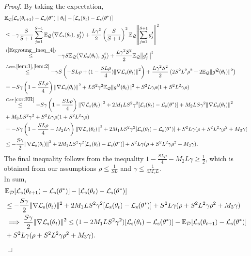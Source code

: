 \documentclass{article}
\theoremstyle{plain}
\theoremstyle{definition}
\theoremstyle{remark}
\newcommand{\ip}[2]{{\left\langle #1, \, #2 \right\rangle}}
\newcommand{\no}[1]{{\left\lVert #1 \right\rVert}}
\newcommand{\EgQ}{\E_\gQ}
\begin{document}
\begin{proof}
    
    By taking the expectation,
    \begin{align*}
        &\EgQ[\gL_{\text{s}}(\theta_{t+1})-\gL_{\text{s}}(\theta^*)\mid\theta_t] - [\gL_{\text{s}}(\theta_t)-\gL_{\text{s}}(\theta^*)] \\
        &\leq -\gamma\frac{S}{S+1}\sum\limits_{j=1}^{S+1}\EgQ\ip{\nabla \gL_{\text{s}}(\theta_t)}{g_j^t}+\frac{L\gamma^2}{2}\left(\frac{S}{S+1}\right)^2\EgQ\no{\sum\limits_{j=1}^{S+1}g_j^t}^2 \\
        &\overset{(\ref{Eq:young_ineq_4})}{\leq} -\gamma S\EgQ\ip{\nabla \gL_{\text{s}}(\theta_t)}{g_j^t}+\frac{L\gamma^2S^2}{2}\EgQ\no{g_j^t}^2 \\
        &\overset{Lem. \ref{lem:1}, \ref{lem:2}}{\leq} -\gamma S \left(-SL\rho + (1-\frac{SL\rho}{4})\no{\nabla \gL_{\text{s}}(\theta_t)}^2\right)+\frac{L\gamma^2S^2}{2}\left(2S^2L^2\rho^2+2\EgQ\lV g^{\gQ}(\theta_t)\rV^2\right) \\
        &=-S\gamma \left(1-\frac{SL\rho}{4}\right)\no{\nabla \gL_{\text{s}}(\theta_t)}^2+LS^2\gamma^2\EgQ\lV g^{\gQ}(\theta_t)\rV^2+S^2L\gamma\rho(1+S^2L^2\gamma\rho)\\
        &\overset{Cor. \ref{cor:ER}}{\leq}-S\gamma \left(1-\frac{SL\rho}{4}\right)\no{\nabla \gL_{\text{s}}(\theta_t)}^2 + 2M_1LS^2\gamma^2[\gL_{\text{s}}(\theta_t)-\gL_{\text{s}}(\theta^*)]+M_2LS\gamma^2\no{\nabla \gL_{\text{s}}(\theta_t)}^2\\&+M_3LS^2\gamma^2+S^2L\gamma\rho(1+S^2L^2\gamma\rho) \\
        &= -S\gamma \left(1-\frac{SL\rho}{4}-M_2L\gamma\right)\no{\nabla \gL_{\text{s}}(\theta_t)}^2 + 2M_1LS^2\gamma^2[\gL_{\text{s}}(\theta_t)-\gL_{\text{s}}(\theta^*)]+S^2L\gamma(\rho+S^2L^2\gamma\rho^2+M_3\gamma)\\
        &\leq -\frac{S\gamma}{2}\no{\nabla \gL_{\text{s}}(\theta_t)}^2 + 2M_1LS^2\gamma^2[\gL_{\text{s}}(\theta_t)-\gL_{\text{s}}(\theta^*)]+S^2L\gamma(\rho+S^2L^2\gamma\rho^2+M_3\gamma).
    \end{align*}
    The final inequality follows from the inequality \(1-\frac{SL\rho}{4}-M_2L\gamma\geq\frac{1}{2}\), which is obtained from our assumptions \(\rho\leq\frac{1}{SL}\) and \(\gamma\leq\frac{1}{4M_2L}\).\\
    In sum, 
    \begin{align}
    &\mathbb{E}_{\mathcal{D}}[{\mathcal{L}}_{\text{s}}(\theta_{t+1}) - {\mathcal{L}}_{\text{s}}(\theta^*)] - [{\mathcal{L}}_{\text{s}}(\theta_t) - {\mathcal{L}}_{\text{s}}(\theta^*)] \notag \\
    &\leq -\frac{S\gamma}{2} \|\nabla {\mathcal{L}}_{\text{s}}(\theta_t)\|^2 + 2M_1LS^2\gamma^2 [{\mathcal{L}}_{\text{s}}(\theta_t) - {\mathcal{L}}_{\text{s}}(\theta^*)]  + S^2L\gamma(\rho + S^2L^2\gamma\rho^2 + M_3\gamma) \notag \\
    &\implies \frac{S\gamma}{2} \|\nabla {\mathcal{L}}_{\text{s}}(\theta_t)\|^2 \leq (1 + 2M_1LS^2\gamma^2)[{\mathcal{L}}_{\text{s}}(\theta_t) - {\mathcal{L}}_{\text{s}}(\theta^*)]- \mathbb{E}_{\mathcal{D}}[{\mathcal{L}}_{\text{s}}(\theta_{t+1}) - {\mathcal{L}}_{\text{s}}(\theta^*)] \notag \\&+ S^2L\gamma(\rho + S^2L^2\gamma\rho^2 + M_3\gamma). 
    \label{eq:fnormineq}
    \end{align}   
    

\end{proof}
\end{document}
